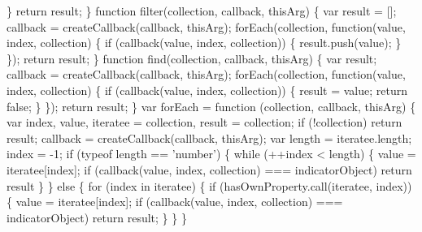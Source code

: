 \begin{DoxyCodeInclude}
{{\textcolor{stringliteral}{    \}}
\textcolor{stringliteral}{    return result;}
\textcolor{stringliteral}{  \}}
\textcolor{stringliteral}{}
\textcolor{stringliteral}{  function filter(collection, callback, thisArg) \{}
\textcolor{stringliteral}{    var result = [];}
\textcolor{stringliteral}{    callback = createCallback(callback, thisArg);}
\textcolor{stringliteral}{    forEach(collection, function(value, index, collection) \{}
\textcolor{stringliteral}{      if (callback(value, index, collection)) \{}
\textcolor{stringliteral}{        result.push(value);}
\textcolor{stringliteral}{      \}}
\textcolor{stringliteral}{    \});}
\textcolor{stringliteral}{    return result;}
\textcolor{stringliteral}{  \}}
\textcolor{stringliteral}{}
\textcolor{stringliteral}{  function find(collection, callback, thisArg) \{}
\textcolor{stringliteral}{    var result;}
\textcolor{stringliteral}{    callback = createCallback(callback, thisArg);}
\textcolor{stringliteral}{    forEach(collection, function(value, index, collection) \{}
\textcolor{stringliteral}{      if (callback(value, index, collection)) \{}
\textcolor{stringliteral}{        result = value;}
\textcolor{stringliteral}{        return false;}
\textcolor{stringliteral}{      \}}
\textcolor{stringliteral}{    \});}
\textcolor{stringliteral}{    return result;}
\textcolor{stringliteral}{  \}}
\textcolor{stringliteral}{}
\textcolor{stringliteral}{  var forEach = function (collection, callback, thisArg) \{}
\textcolor{stringliteral}{    var index, value, iteratee = collection, result = collection;}
\textcolor{stringliteral}{    if (!collection) return result;}
\textcolor{stringliteral}{    callback = createCallback(callback, thisArg);}
\textcolor{stringliteral}{    var length = iteratee.length; index = -1;}
\textcolor{stringliteral}{    if (typeof length == 'number') \{  }
\textcolor{stringliteral}{      while (++index < length) \{}
\textcolor{stringliteral}{        value = iteratee[index];}
\textcolor{stringliteral}{        if (callback(value, index, collection) === indicatorObject) return result}
\textcolor{stringliteral}{      \}}
\textcolor{stringliteral}{    \}}
\textcolor{stringliteral}{    else \{  }
\textcolor{stringliteral}{      for (index in iteratee) \{}
\textcolor{stringliteral}{        if (hasOwnProperty.call(iteratee, index)) \{    }
\textcolor{stringliteral}{        value = iteratee[index];}
\textcolor{stringliteral}{        if (callback(value, index, collection) === indicatorObject) return result;    }
\textcolor{stringliteral}{        \}}
\textcolor{stringliteral}{      \}    }
\textcolor{stringliteral}{    \}}
}}
\end{DoxyCodeInclude}
